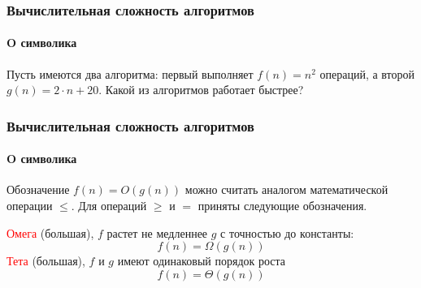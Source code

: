 \documentclass[aspectratio=169]{beamer}
\begin{document}
\begin{frame}
\frametitle{Вычислительная сложность алгоритмов}
\framesubtitle{O символика}
\justifying
Пусть имеются два алгоритма: первый выполняет $f(n) = n^2$ операций, а второй $g(n) = 2\cdot n + 20$. Какой из алгоритмов работает быстрее?

\begin{figure}
    \captionsetup[subfigure]{labelformat=empty}
    \centering
\end{figure}
\end{frame}

\begin{frame}
\frametitle{Вычислительная сложность алгоритмов}
\framesubtitle{O символика}
\justifying
Обозначение $f(n) = O(g(n))$ можно считать аналогом математической операции $\leq$. Для операций $\geq$ и $=$ приняты следующие обозначения.\newline\newline

\textcolor{red}{Омега} (большая), $f$ растет не медленнее $g$ с точностью до константы:
$$f(n) = \Omega(g(n))$$\newline
\textcolor{red}{Тета} (большая), $f$ и $g$ имеют одинаковый порядок роста\newline
$$f(n) = \Theta(g(n))$$
\end{frame}
\end{document}
